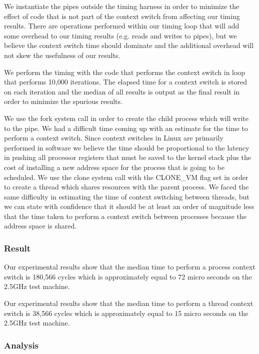 We instantiate the pipes outside the timing harness in order to minimize the effect
of code that is not part of the context switch from affecting our timing
results. There are operations performed within our timing loop that will add
some overhead to our timing results (e.g. reads and writes to pipes), but we
believe the context switch time should dominate and the additional overhead will
not skew the usefulness of our results.

We perform the timing with the code that performs the context switch in loop
that performs 10,000 iterations. The elapsed time for a context switch is stored
on each iteration and the median of all results is output as the final result in
order to minimize the spurious results.

We use the fork system call in order to create the child process which will
write to the pipe. We had a difficult time coming up with an estimate for the
time to perform a context switch. Since context switches in Linux are primarily
performed in software we believe the time should be proportional to the latency
in pushing all processor registers that must be saved to the kernel stack plus
the cost of installing a new address space for the process that is going to be
scheduled.
We use the clone system call with the CLONE\_VM flag set in order to create a
thread which shares resources with the parent process. We faced the same
difficulty in estimating the time of context switching between threads, but we
can state with confidence that it should be at least an order of magnitude less
that the time taken to perform a context switch between processes because the
address space is shared.
\subsubsection{Result}

Our experimental results show that the median time to perform a process context
switch is 180,566 cycles which is approximately equal to 72 micro seconds on the
2.5GHz test machine. 


Our experimental results show that the median time to perform a thread context
switch is 38,566 cycles which is approximately equal to 15 micro seconds on the
2.5GHz test machine.

\subsubsection{Analysis}


